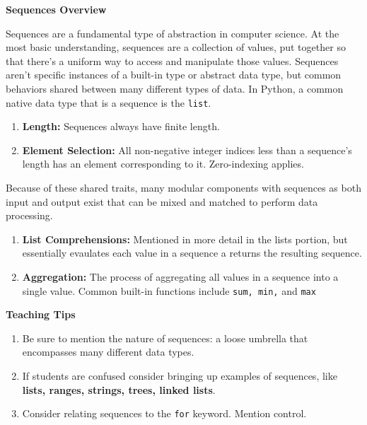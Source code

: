 \textbf{Sequences Overview}

Sequences are a fundamental type of abstraction in computer science.
At the most basic understanding, sequences are a collection of values, put together so that there's a uniform way to access and manipulate those values.
Sequences aren't specific instances of a built-in type or abstract data type, but common behaviors shared between many different types of data.
In Python, a common native data type that is a sequence is the \lstinline{list}.
\begin{enumerate}
	\item \textbf{Length: } Sequences always have finite length.
	\item \textbf{Element Selection: } All non-negative integer indices less than a sequence's length has an element corresponding to it. Zero-indexing applies.
\end{enumerate}

Because of these shared traits, many modular components with sequences as both input and output exist that can be mixed and matched to perform data processing.
\begin{enumerate}
    \item \textbf{List Comprehensions: } Mentioned in more detail in the lists portion, but essentially evaulates each value in a sequence a returns the resulting sequence.
    \item \textbf{Aggregation: } The process of aggregating all values in a sequence into a single value. Common built-in functions include \lstinline{sum, min,} and \lstinline{max}
\end{enumerate}
\begin{blocksection}
	\begin{guide}
	\textbf{Teaching Tips}
	\begin{enumerate}
		\item Be sure to mention the nature of sequences: a loose umbrella that encompasses many different data types.
		\item If students are confused consider bringing up examples of sequences, like \textbf{lists, ranges, strings, trees, linked lists}.
		\item Consider relating sequences to the \lstinline{for} keyword. Mention control.
	\end{enumerate}
	\end{guide}
\end{blocksection}

